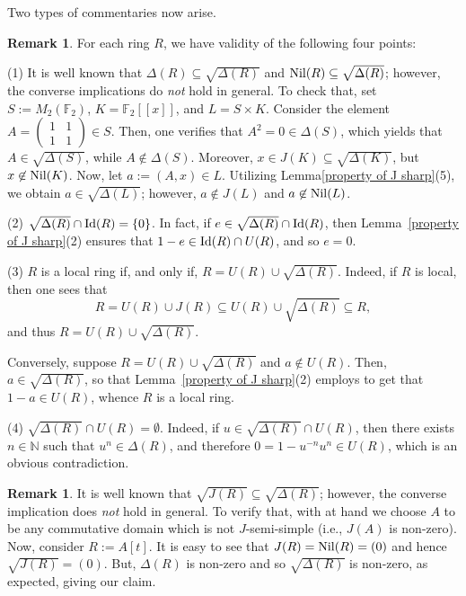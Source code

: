 \documentclass[11pt]{amsart}
\theoremstyle{definition}
\newtheorem{remark}[theorem]{Remark}
\begin{document}

Two types of commentaries now arise.

\begin{remark}\label{local}
For each ring \( R \), we have validity of the following four points:

(1) It is well known that $\Delta(R)\subseteq \sqrt{\Delta(R)}$ and ${\rm Nil}(R)\subseteq \sqrt{\Delta(R)}$;
however, the converse implications do {\it not} hold in general. To check that, set $S:=M_{2}(\mathbb{F}_{2})$,
$K=\mathbb{F}_{2}[[x]]$, and $L=S\times K$. Consider the element
$
A=\begin{pmatrix}
	1 & 1\\
	1 & 1
\end{pmatrix}\in S.
$
Then, one verifies that $A^{2}=0\in \Delta(S)$, which yields that $A\in \sqrt{\Delta(S)}$, while
$A\not\in \Delta(S)$. Moreover, $x\in J(K)\subseteq \sqrt{\Delta(K)}$, but
$x\not\in {\rm Nil}(K)$. Now, let $a:=(A,x)\in L$. Utilizing Lemma\ref{property of J sharp}(5), we obtain
$a\in \sqrt{\Delta(L)}$; however, $a\not\in J(L)$ and $a\not\in {\rm Nil}(L)$.

(2) \( \sqrt{\Delta(R)} \cap {\rm Id}(R) = \{0\} \). In fact, if \( e \in \sqrt{\Delta(R)} \cap {\rm Id}(R) \), then Lemma~\ref{property of J sharp}(2) ensures that \( 1-e \in {\rm Id}(R) \cap U(R) \), and so \( e=0 \).

(3) \( R \) is a local ring if, and only if, \( R=U(R) \cup \sqrt{\Delta(R)} \). Indeed, if \( R \) is local, then
one sees that \[ R=U(R) \cup J(R) \subseteq U(R) \cup \sqrt{\Delta(R)} \subseteq R ,\] and thus \( R=U(R) \cup \sqrt{\Delta(R)} \).

Conversely, suppose \( R=U(R) \cup \sqrt{\Delta(R)} \) and \( a \notin U(R) \). Then, \( a \in \sqrt{\Delta(R)} \), so that Lemma~\ref{property of J sharp}(2) employs to get that \( 1-a \in U(R) \), whence \( R \) is a local ring.

(4) \( \sqrt{\Delta(R)} \cap U(R) = \emptyset \). Indeed, if \( u \in \sqrt{\Delta(R)} \cap U(R) \), then there exists \( n \in \mathbb{N} \) such that \( u^n \in \Delta(R) \), and therefore \( 0=1-u^{-n}u^n \in U(R) \), which is an obvious contradiction.
\end{remark}

\begin{remark}\label{locall}
It is well known that $\sqrt{J(R)}\subseteq \sqrt{\Delta(R)}$; however, the converse implication does {\it not} hold in general. To verify that, with \cite[Ex 4.24]{lamm} at hand we choose $A$ to be any commutative domain which is not $J$-semi-simple (i.e., $J(A)$ is non-zero). Now, consider $R:=A[t]$. It is easy to see that $J(R)={\rm Nil}(R)=(0)$ and hence $\sqrt{J(R)}=(0)$. But, $\Delta(R)$ is non-zero and so $\sqrt{\Delta(R)}$ is non-zero, as expected, giving our claim.
\end{remark}
\end{document}

